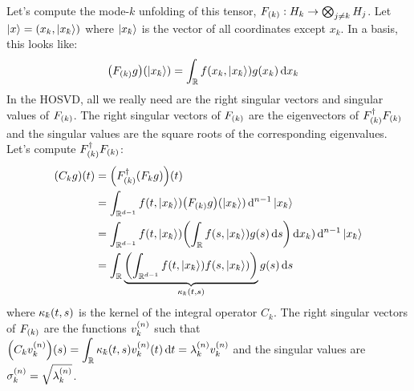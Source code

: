 \documentclass[12pt]{article}
\newcommand{\kbar}{\mathchar'26\mkern-9mu k}
\numberwithin{theorem}{section}
\numberwithin{equation}{section}
\numberwithin{figure}{section}
\begin{document}
Let's compute the mode-\(k\) unfolding of this tensor, \(F_{\qty(k)} : H_k \to
\bigotimes_{j \neq k}H_j\). Let \(\ket{x} = \qty(x_k, \ket{x_{\kbar}})\) where
\(\ket{x_{\kbar}}\) is the vector of all coordinates except \(x_k\). In a basis,
this looks like:
\begin{align*}
    \qty(F_{\qty(k)}g)\qty(\ket{x_{\kbar}}) &= \int_{\mathbb{R}} f\qty(x_k, \ket{x_{\kbar}}) g\qty(x_k) \dd{x_k}
\end{align*}
In the HOSVD, all we really need are the right singular vectors and singular
values of \(F_{\qty(k)}\). The right singular vectors of \(F_{\qty(k)}\) are the
eigenvectors of \(F_{\qty(k)}^\dagger F_{\qty(k)}\) and the singular values are
the square roots of the corresponding eigenvalues. Let's compute
\(F_{\qty(k)}^\dagger F_{\qty(k)}\):
\begin{align*}
    \qty(C_kg)\qty(t) &= \qty(F_{\qty(k)}^\dagger\qty(F_{k}g))\qty(t) \\
                      &= \int_{\mathbb{R}^{d-1}} f\qty(t, \ket{x_{\kbar}}) \qty(F_{\qty(k)}g)\qty(\ket{x_{\kbar}}) \dd[n-1]{\ket{x_{\kbar}}} \\
                      &= \int_{\mathbb{R}^{d-1}} f\qty(t, \ket{x_{\kbar}}) \qty(\int_{\mathbb{R}} f\qty(s, \ket{x_{\kbar}})g\qty(s)\dd{s}) \dd{x_k}) \dd[n-1]{\ket{x_{\kbar}}} \\
                      &= \int_{\mathbb{R}} \underbrace{\qty(\int_{\mathbb{R}^{d-1}} f\qty(t, \ket{x_{\kbar}})f\qty(s, \ket{x_{\kbar}}))}_{\kappa_{\kbar}\qty(t, s)} g\qty(s) \dd{s}
\end{align*}
where \(\kappa_{\kbar}\qty(t, s)\) is the kernel of the integral operator
\(C_k\). The right singular vectors of \(F_{\qty(k)}\) are the functions
\(v_{k}^{\qty(n)}\) such that \(\displaystyle\qty(C_kv_k^{\qty(n)})\qty(s) =
\int_{\mathbb{R}} \kappa_{\kbar}\qty(t, s) v_k^{\qty(n)}\qty(t) \dd{t} =
\lambda_k^{\qty(n)}v_k^{\qty(n)}\) and the singular values are
\(\sigma_k^{\qty(n)} = \sqrt{\lambda_k^{\qty(n)}}\).
\end{document}
